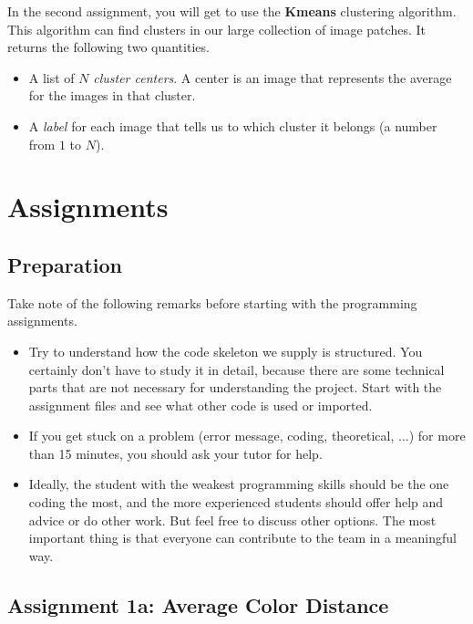 \documentclass[a4paper]{article}
\begin{document}
		In the second assignment, you will get to use the \textbf{Kmeans} clustering algorithm. 
		This algorithm can find clusters in our large collection of image patches.
		It returns the following two quantities.
		\begin{itemize}
			\item A list of $N$ \emph{cluster centers}. 
			A center is an image that represents the average for the images in that cluster.
			\item A \emph{label} for each image that tells us to which cluster it belongs (a number from $1$ to $N$).
		\end{itemize}
		
		
		

\section{Assignments}

	\subsection{Preparation}
		Take note of the following remarks before starting with the programming assignments.
		\begin{itemize}
			\item Try to understand how the code skeleton we supply is structured.
			You certainly don't have to study it in detail, because there are some technical parts that are not necessary for understanding the project.
			Start with the assignment files and see what other code is used or imported.
			
			\item If you get stuck on a problem (error message, coding, theoretical, ...) for more than 15 minutes, you should ask your tutor for help.
			
			\item Ideally, the student with the weakest programming skills should be the one coding the most, and the more experienced students should offer help and advice or do other work. 
			But feel free to discuss other options. 
			The most important thing is that everyone can contribute to the team in a meaningful way.
		\end{itemize}

	\subsection{Assignment 1a: Average Color Distance}
\end{document}
